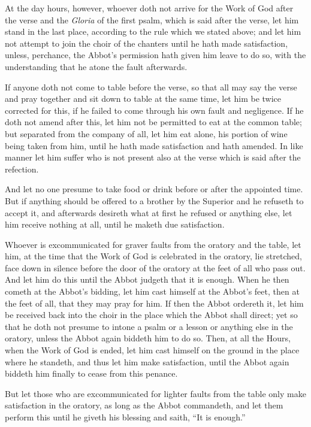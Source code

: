 At the day hours, however, whoever doth not arrive for the Work of God after the verse and the \emph{Gloria} of the first psalm, which is said after the verse, let him stand in the last place, according to the rule which we stated above; and let him not attempt to join the choir of the chanters until he hath made satisfaction, unless, perchance, the Abbot's permission hath given him leave to do so, with the understanding that he atone the fault afterwards.

If anyone doth not come to table before the verse, so that all may say the verse and pray together and sit down to table at the same time, let him be twice corrected for this, if he failed to come through his own fault and negligence. If he doth not amend after this, let him not be permitted to eat at the common table; but separated from the company of all, let him eat alone, his portion of wine being taken from him, until he hath made satisfaction and hath amended. In like manner let him suffer who is not present also at the verse which is said after the refection.

And let no one presume to take food or drink before or after the appointed time. But if anything should be offered to a brother by the Superior and he refuseth to accept it, and afterwards desireth what at first he refused or anything else, let him receive nothing at all, until he maketh due satisfaction.


Whoever is excommunicated for graver faults from the oratory and the table, let him, at the time that the Work of God is celebrated in the oratory, lie stretched, face down in silence before the door of the oratory at the feet of all who pass out. And let him do this until the Abbot judgeth that it is enough. When he then cometh at the Abbot's bidding, let him cast himself at the Abbot's feet, then at the feet of all, that they may pray for him. If then the Abbot ordereth it, let him be received back into the choir in the place which the Abbot shall direct; yet so that he doth not presume to intone a psalm or a lesson or anything else in the oratory, unless the Abbot again biddeth him to do so. Then, at all the Hours, when the Work of God is ended, let him cast himself on the ground in the place where he standeth, and thus let him make satisfaction, until the Abbot again biddeth him finally to cease from this penance.

But let those who are excommunicated for lighter faults from the table only make satisfaction in the oratory, as long as the Abbot commandeth, and let them perform this until he giveth his blessing and saith, ``It is enough.''

